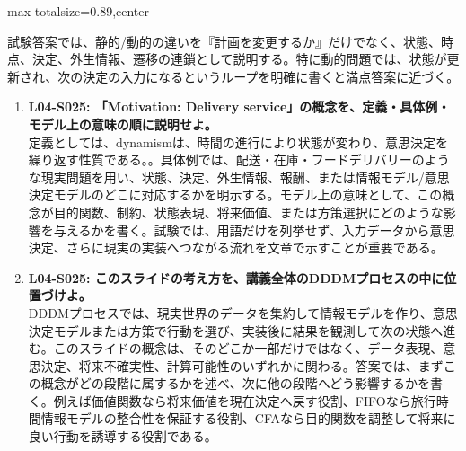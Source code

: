 \begin{minipage}[t]{0.58\textwidth}
\begin{adjustbox}{max totalsize={\textwidth}{0.89\textheight},center}
\begin{minipage}{\textwidth}
試験答案では、静的/動的の違いを『計画を変更するか』だけでなく、状態、時点、決定、外生情報、遷移の連鎖として説明する。特に動的問題では、状態が更新され、次の決定の入力になるというループを明確に書くと満点答案に近づく。\par{}\begin{enumerate}\item \textbf{L04-S025: 「Motivation: Delivery service」の概念を、定義・具体例・モデル上の意味の順に説明せよ。}\\定義としては、dynamismは、時間の進行により状態が変わり、意思決定を繰り返す性質である。。具体例では、配送・在庫・フードデリバリーのような現実問題を用い、状態、決定、外生情報、報酬、または情報モデル/意思決定モデルのどこに対応するかを明示する。モデル上の意味として、この概念が目的関数、制約、状態表現、将来価値、または方策選択にどのような影響を与えるかを書く。試験では、用語だけを列挙せず、入力データから意思決定、さらに現実の実装へつながる流れを文章で示すことが重要である。\item \textbf{L04-S025: このスライドの考え方を、講義全体のDDDMプロセスの中に位置づけよ。}\\DDDMプロセスでは、現実世界のデータを集約して情報モデルを作り、意思決定モデルまたは方策で行動を選び、実装後に結果を観測して次の状態へ進む。このスライドの概念は、そのどこか一部だけではなく、データ表現、意思決定、将来不確実性、計算可能性のいずれかに関わる。答案では、まずこの概念がどの段階に属するかを述べ、次に他の段階へどう影響するかを書く。例えば価値関数なら将来価値を現在決定へ戻す役割、FIFOなら旅行時間情報モデルの整合性を保証する役割、CFAなら目的関数を調整して将来に良い行動を誘導する役割である。\end{enumerate}
\end{minipage}
\end{adjustbox}
\end{minipage}


